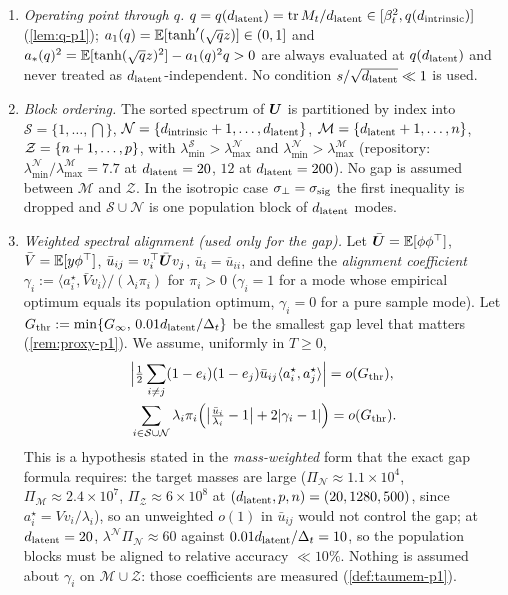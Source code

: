 \begin{assumption}
\begin{enumerate}
\item[(A4)] \emph{Operating point through $q$.} $q=q(d_{\mathrm{latent}})=\operatorname{tr}M_t/d_{\mathrm{latent}}\in[\beta_t^2,q(d_{\mathrm{intrinsic}})]$ (\cref{lem:q-p1}); $a_1(q)=\mathbb{E}[\tanh'(\sqrt qz)]\in(0,1]$ and $a_*(q)^2=\mathbb{E}[\tanh(\sqrt qz)^2]-a_1(q)^2q>0$ are always evaluated at $q(d_{\mathrm{latent}})$ and never treated as $d_{\mathrm{latent}}$-independent. No condition $s/\sqrt{d_{\mathrm{latent}}}\ll1$ is used.
\item[(A5)] \emph{Block ordering.} The sorted spectrum of $\bm{U}$ is partitioned by index into $\mathcal S=\{1,\dots,\dint\}$, $\mathcal N=\{d_{\mathrm{intrinsic}}+1,\dots,d_{\mathrm{latent}}\}$, $\mathcal M=\{d_{\mathrm{latent}}+1,\dots,n\}$, $\mathcal Z=\{n+1,\dots,p\}$, with $\lambda^{\mathcal S}_{\min}>\lambda^{\mathcal N}_{\max}$ and $\lambda^{\mathcal N}_{\min}>\lambda^{\mathcal M}_{\max}$ (repository: $\lambda^{\mathcal N}_{\min}/\lambda^{\mathcal M}_{\max}=7.7$ at $d_{\mathrm{latent}}=20$, $12$ at $d_{\mathrm{latent}}=200$). No gap is assumed between $\mathcal M$ and $\mathcal Z$. In the isotropic case $\sigma_{\perp}=\sigma_{\mathrm{sig}}$ the first inequality is dropped and $\mathcal S\cup\mathcal N$ is one population block of $d_{\mathrm{latent}}$ modes.
\item[(A6$'$)] \emph{Weighted spectral alignment (used only for the gap).} Let $\bar{\bm{U}}=\mathbb{E}[\phi\phi^{\top}]$, $\bar V=\mathbb{E}[y\phi^{\top}]$, $\bar u_{ij}=v_i^{\top}\bar{\bm{U}} v_j$, $\bar u_i=\bar u_{ii}$, and define the \emph{alignment coefficient} $\gamma_i:=\langle a_i^\star,\bar Vv_i\rangle/(\lambda_i\pi_i)$ for $\pi_i>0$ ($\gamma_i=1$ for a mode whose empirical optimum equals its population optimum, $\gamma_i=0$ for a pure sample mode). Let $G_{\rm thr}:=\min\{G_\infty,\,0.01d_{\mathrm{latent}}/\Delta_t\}$ be the smallest gap level that matters (\cref{rem:proxy-p1}). We assume, uniformly in $T\ge0$,
\[\begin{aligned}&
\Big|\tfrac12\sum_{i\ne j}(1-e_i)(1-e_j)\bar u_{ij}\langle a_i^\star,a_j^\star\rangle\Big|=o(G_{\rm thr}),\\ &
\sum_{i\in\mathcal S\cup\mathcal N}\lambda_i\pi_i\Big(\big|\tfrac{\bar u_i}{\lambda_i}-1\big|+2|\gamma_i-1|\Big)=o(G_{\rm thr}).
\end{aligned}\]
This is a hypothesis stated in the \emph{mass-weighted} form that the exact gap formula requires: the target masses are large ($\Pi_{\mathcal N}\approx1.1\times10^4$, $\Pi_{\mathcal M}\approx2.4\times10^7$, $\Pi_{\mathcal Z}\approx6\times10^8$ at $(d_{\mathrm{latent}},p,n)=(20,1280,500)$, since $a_i^\star=Vv_i/\lambda_i$), so an unweighted $o(1)$ in $\bar u_{ij}$ would not control the gap; at $d_{\mathrm{latent}}=20$, $\lambda^{\mathcal N}\Pi_{\mathcal N}\approx60$ against $0.01d_{\mathrm{latent}}/\Delta_t=10$, so the population blocks must be aligned to relative accuracy $\ll10\%$. Nothing is assumed about $\gamma_i$ on $\mathcal M\cup\mathcal Z$: those coefficients are measured (\cref{def:taumem-p1}).
\end{enumerate}
\end{assumption}


